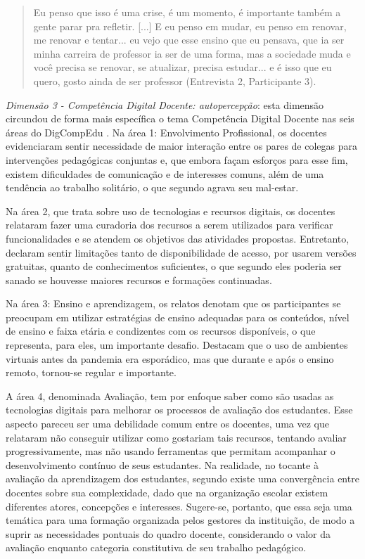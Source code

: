 \documentclass[portuguese]{textolivre}
\begin{document}
\begin{quote}
    Eu penso que isso é uma crise, é um momento, é importante também a gente parar pra refletir. [...] E eu penso em mudar, eu penso em renovar, me renovar e tentar... eu vejo que esse ensino que eu pensava, que ia ser minha carreira de professor ia ser de uma forma, mas a sociedade muda e você precisa se renovar, se atualizar, precisa estudar... e é isso que eu quero, gosto ainda de ser professor (Entrevista 2, Participante 3).
\end{quote}

\textit{Dimensão 3 - Competência Digital Docente: autopercepção}: esta dimensão circundou de forma mais específica o tema Competência Digital Docente nas seis áreas do DigCompEdu \cite{redecker2017}. Na área 1: Envolvimento Profissional, os docentes evidenciaram sentir necessidade de maior interação entre os pares de colegas para intervenções pedagógicas conjuntas e, que embora façam esforços para esse fim, existem dificuldades de comunicação e de interesses comuns, além de uma tendência ao trabalho solitário, o que segundo \textcite{imbernon2017} agrava seu mal-estar. 

Na área 2, que trata sobre uso de tecnologias e recursos digitais, os docentes relataram fazer uma curadoria dos recursos a serem utilizados para verificar funcionalidades e se atendem os objetivos das atividades propostas. Entretanto, declaram sentir limitações tanto de disponibilidade de acesso, por usarem versões gratuitas, quanto de conhecimentos suficientes, o que segundo eles poderia ser sanado se houvesse maiores recursos e formações continuadas.

Na área 3: Ensino e aprendizagem, os relatos denotam que os participantes se preocupam em utilizar estratégias de ensino adequadas para os conteúdos, nível de ensino e faixa etária e condizentes com os recursos disponíveis, o que representa, para eles, um importante desafio. Destacam que o uso de ambientes virtuais antes da pandemia era esporádico, mas que durante e após o ensino remoto, tornou-se regular e importante.

A área 4, denominada Avaliação, tem por enfoque saber como são usadas as tecnologias digitais para melhorar os processos de avaliação dos estudantes. Esse aspecto pareceu ser uma debilidade comum entre os docentes, uma vez que relataram não conseguir utilizar como gostariam tais recursos, tentando avaliar progressivamente, mas não usando ferramentas que permitam acompanhar o desenvolvimento contínuo de seus estudantes. Na realidade, no tocante à avaliação da aprendizagem dos estudantes, segundo \textcite{sordi2009avaliacao} existe uma convergência entre docentes sobre sua complexidade, dado que na organização escolar existem diferentes atores, concepções e interesses. Sugere-se, portanto, que essa seja uma temática para uma formação organizada pelos gestores da instituição, de modo a suprir as necessidades pontuais do quadro docente, considerando o valor da avaliação enquanto categoria constitutiva de seu trabalho pedagógico.
\end{document}
